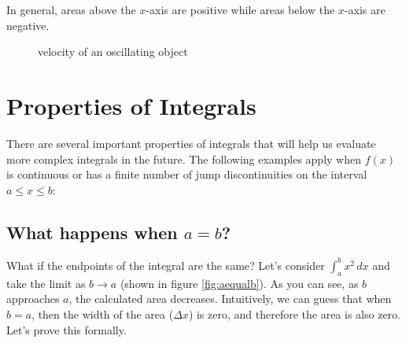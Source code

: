In general, areas above the $x$-axis are positive while areas below 
the $x$-axis are negative.

\begin{figure}[htbp]
	\caption{velocity of an oscillating object}
	\label{fig:oscillate}
\end{figure}

\section{Properties of Integrals}
There are several important properties of integrals that will help us 
evaluate more complex integrals in the future. The following examples 
apply when $f(x)$ is continuous or has a finite number of jump 
discontinuities on the interval $a \leq x \leq b$:

\subsection{What happens when $a=b$?}

What if the endpoints of the integral are the same? Let's consider 
$\int_a^b x^2\,dx$ and take the limit as $b \to a$ (shown in figure 
\ref{fig:aequalb}). As you can see, as $b$ approaches $a$, the 
calculated area decreases. Intuitively, we can guess that when $b=a$, 
then the width of the area ($\Delta x$) is zero, and therefore the 
area is also zero. Let's prove this formally. 


